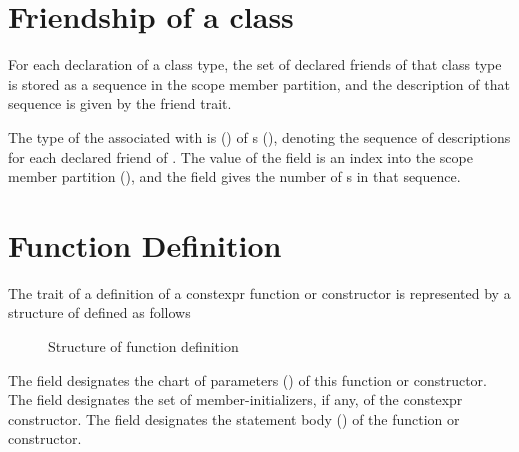 

\section{Friendship of a class}
\label{sec:ifc-friend-trait}

For each declaration  of a class type, the set of declared friends of that class type 
is stored as a sequence in the scope member partition, and the description of that sequence is given by the friend trait.


The type  of the  associated with  is  ()
of s (),
denoting the sequence of descriptions for each declared friend of .  The
value of the field  is an index into the scope member partition 
(), and the field  gives the number of s
in that sequence.



\section{Function Definition}
\label{sec:ifc-function-definition-trait}

The trait of a definition of a constexpr function or constructor is represented by a structure of defined as follows
\begin{figure}[H]
	\centering
	\caption{Structure of function definition}
	\label{fig:ifc-function-definition-structure}
\end{figure}
%
The  field designates the chart of parameters () of this function or constructor.
The  field designates the set of member-initializers, if any, of the constexpr constructor.
The  field designates the statement body () of the function or constructor.

